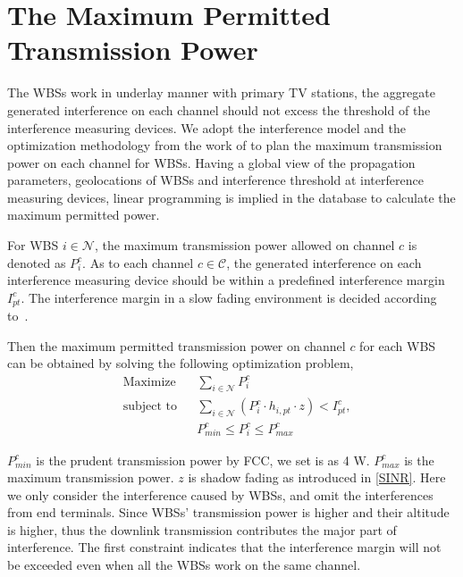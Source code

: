 \section{The Maximum Permitted Transmission Power}
\label{powermap}
The WBSs work in underlay manner with primary TV stations, the aggregate generated interference on each channel should not excess the threshold of the interference measuring devices.
We adopt the interference model and the optimization methodology from the work of \cite{multipleIntf_pimrc11} to plan the maximum transmission power on each channel for WBSs.
Having a global view of the propagation parameters, geolocations of WBSs and interference threshold at interference measuring devices, linear programming is implied in the database to calculate the maximum permitted power.

For WBS $i\in \mathcal{N}$, the maximum transmission power allowed on channel $c$ is denoted as $P_i^c$. 
As to each channel $c\in \mathcal{C}$, the generated interference on each interference measuring device should be within a predefined interference margin $I^c_{pt}$.
The interference margin in a slow fading environment is decided according to~\cite{aggregate_interference_shadow_fading_2010}.

Then the maximum permitted transmission power on channel $c$ for each WBS can be obtained by solving the following optimization problem,
	\begin{equation}
\label{lp}
		\begin{aligned}
		& {\text{Maximize}}
		& & \sum_{i\in \mathcal{N}} P^c_i \\
		& \text{subject to}
		& & \sum_{i\in \mathcal{N}} (P^c_i \cdot h_{i,pt}\cdot z) < I^c_{pt},\\
		& & & P_{min}^c \leq P_i^c \leq P_{max}^c		
		\end{aligned}
	\end{equation}
	

$P_{min}^c$ is the prudent transmission power by FCC, we set is as 4 W. 
$P_{max}^c$ is the maximum transmission power.
$z$ is shadow fading as introduced in \ref{SINR}.
Here we only consider the interference caused by WBSs, and omit the interferences from end terminals. 
Since WBSs' transmission power is higher and their altitude is higher\cite{multipleIntf_pimrc11}, thus the downlink transmission contributes the major part of interference\cite{infmitigate07mobicom}.
The first constraint indicates that the interference margin will not be exceeded even when all the WBSs work on the same channel.


